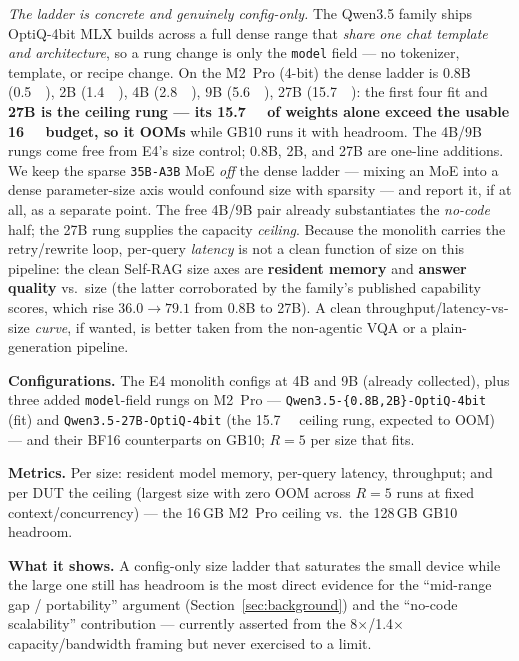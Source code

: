 \emph{The ladder is concrete and genuinely config-only.} The Qwen3.5
family ships OptiQ-4bit MLX builds across a full dense range that
\emph{share one chat template and architecture}, so a rung change is only
the \texttt{model} field --- no tokenizer, template, or recipe change. On
the M2~Pro (4-bit) the dense ladder is 0.8B (\SI{0.5}{\giga\byte}), 2B
(\SI{1.4}{\giga\byte}), 4B (\SI{2.8}{\giga\byte}), 9B
(\SI{5.6}{\giga\byte}), 27B (\SI{15.7}{\giga\byte}): the first four fit and
\textbf{27B is the ceiling rung --- its \SI{15.7}{\giga\byte} of weights
alone exceed the usable \SI{16}{\giga\byte} budget, so it OOMs} while GB10
runs it with headroom. The 4B/9B rungs come free from E4's size control;
0.8B, 2B, and 27B are one-line additions. We keep the sparse
\texttt{35B-A3B} MoE \emph{off} the dense ladder --- mixing an MoE into a
dense parameter-size axis would confound size with sparsity --- and report
it, if at all, as a separate point. The free 4B/9B pair already
substantiates the \emph{no-code} half; the 27B rung supplies the capacity
\emph{ceiling}. Because the monolith carries the retry/rewrite loop,
per-query \emph{latency} is not a clean function of size on this pipeline:
the clean Self-RAG size axes are \textbf{resident memory} and
\textbf{answer quality} vs.\ size (the latter corroborated by the family's
published capability scores, which rise $36.0\!\to\!79.1$ from 0.8B to
27B). A clean throughput/latency-vs-size \emph{curve}, if wanted, is better
taken from the non-agentic VQA or a plain-generation pipeline.

\textbf{Configurations.} The E4 monolith configs at 4B and 9B (already
collected), plus three added \texttt{model}-field rungs on M2~Pro ---
\texttt{Qwen3.5-\{0.8B,2B\}-OptiQ-4bit} (fit) and
\texttt{Qwen3.5-27B-OptiQ-4bit} (the \SI{15.7}{\giga\byte} ceiling rung,
expected to OOM) --- and their BF16 counterparts on GB10; $R{=}5$ per size
that fits.

\textbf{Metrics.} Per size: resident model memory, per-query latency,
throughput; and per DUT the ceiling (largest size with zero OOM across
$R{=}5$ runs at fixed context/concurrency) --- the 16\,GB M2~Pro ceiling
vs.\ the 128\,GB GB10 headroom.

\textbf{What it shows.} A config-only size ladder that saturates the small
device while the large one still has headroom is the most direct evidence
for the ``mid-range gap / portability'' argument (Section~\ref{sec:background})
and the ``no-code scalability'' contribution --- currently asserted from the
8$\times$/1.4$\times$ capacity/bandwidth framing but never exercised to a
limit.

